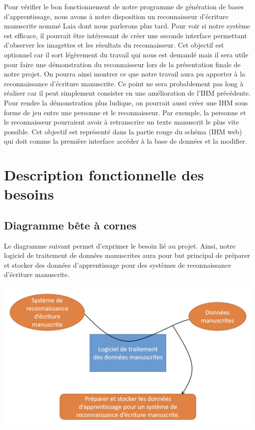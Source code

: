 Pour vérifier le bon fonctionnement de notre programme de génération de bases d’apprentissage, nous avons à notre
disposition un reconnaisseur d’écriture manuscrite nommé Laia\cite{laia:2016} dont nous parlerons plus tard.
Pour voir si notre système est efficace, il pourrait être intéressant de créer une seconde interface permettant
d’observer les imagettes et les résultats du reconnaisseur. Cet objectif est optionnel car il sort légèrement du
travail qui nous est demandé mais il sera utile pour faire une démonstration du reconnaisseur lors de la présentation
finale de notre projet. On pourra ainsi montrer ce que notre travail aura pu apporter à la reconnaissance d’écriture
manuscrite. Ce point ne sera probablement pas long à réaliser car il peut simplement consister en une amélioration
de l’IHM précédente. Pour rendre la démonstration plus ludique, on pourrait aussi créer une IHM sous forme de jeu
entre une personne et le reconnaisseur. Par exemple, la personne et le reconnaisseur pourraient avoir à retranscrire
un texte manuscrit le plus vite possible. Cet objectif est représenté dans la partie rouge du schéma (IHM web) qui
doit comme la première interface accéder à la base de données et la modifier.

\section{Description fonctionnelle des besoins}

\subsection{Diagramme bête à cornes}

Le diagramme suivant permet d’exprimer le besoin lié au projet. Ainsi, notre logiciel de
traitement de données manuscrites aura pour but principal de préparer et stocker des données
d’apprentissage pour des systèmes de reconnaissance d’écriture manuscrite.

\paragraph{}
\begin{mdframed}[frametitle={Figure 6 : Diagramme bête à cornes}, innerbottommargin=10]
\begin{center}
\includegraphics[width=0.7\linewidth]{bete-a-cornes.png}
\end{center}
\end{mdframed}

